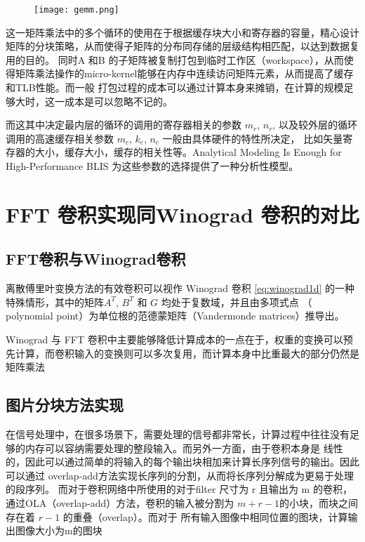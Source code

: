 \begin{figure}
  \texttt{[image: gemm.png]}
\end{figure}

这一矩阵乘法中的多个循环的使用在于根据缓存块大小和寄存器的容量，精心设计矩阵的分块策略，从而使得子矩阵的分布同存储的层级结构相匹配，以达到数据复用的目的。
同时A 和B 的子矩阵被复制打包到临时工作区（workspace），从而使得矩阵乘法操作的micro-kernel能够在内存中连续访问矩阵元素，从而提高了缓存和TLB性能。而一般
打包过程的成本可以通过计算本身来摊销，在计算的规模足够大时，这一成本是可以忽略不记的。

而这其中决定最内层的循环的调用的寄存器相关的参数 $m_r$, $n_r$, 以及较外层的循环调用的高速缓存相关参数 $m_c$, $k_c$, $n_c$ 一般由具体硬件的特性所决定，
比如矢量寄存器的大小，缓存大小，缓存的相关性等。Analytical Modeling Is Enough for High-Performance BLIS 为这些参数的选择提供了一种分析性模型。

\section{FFT 卷积实现同Winograd 卷积的对比}


\subsection{FFT卷积与Winograd卷积}
离散傅里叶变换方法的有效卷积可以视作 Winograd 卷积 \ref{eq:winograd1d} 的一种特殊情形，其中的矩阵$A^T$, $B^T$ 和 $G$ 均处于复数域，并且由多项式点
（ polynomial point）为单位根的范德蒙矩阵（Vandermonde matrices）推导出。

Winograd 与 FFT 卷积中主要能够降低计算成本的一点在于，权重的变换可以预先计算，而卷积输入的变换则可以多次复用，而计算本身中比重最大的部分仍然是矩阵乘法


\subsection{图片分块方法实现}
在信号处理中，在很多场景下，需要处理的信号都非常长，计算过程中往往没有足够的内存可以容纳需要处理的整段输入。而另外一方面，由于卷积本身是
线性的，因此可以通过简单的将输入的每个输出块相加来计算长序列信号的输出。因此可以通过 overlap-add方法实现长序列的分割，从而将长序列分解成为更易于处理的段序列。
而对于卷积网络中所使用的对于filter 尺寸为 r 且输出为 m 的卷积，通过OLA（overlap-add）方法，卷积的输入被分割为 $m + r - 1$的小块，而块之间存在着 $r-1$ 的重叠（overlap）。而对于
所有输入图像中相同位置的图块，计算输出图像大小为m的图块


